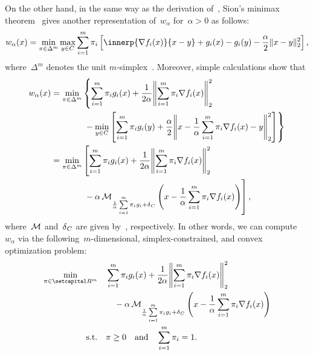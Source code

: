 \documentclass[../../main]{subfiles}
\begin{document}
            On the other hand, in the same way as the derivation of~, Sion's minimax theorem~\cite{Sion1958} gives another representation of~$w_\alpha$ for~$\alpha > 0$ as follows:
            \begin{equation} \label{eq:reg_lin_gap_MO_Sion}
                w_\alpha(x) = \min_{\pi \in \Delta^m} \max_{y \in C} \sum_{i = 1}^{m} \pi_i \left[ \innerp{\nabla f_i(x)}{x - y} + g_i(x) - g_i(y) - \frac{\alpha}{2} \norm{x - y}_2^2 \right] 
            ,\end{equation} 
            where~$\Delta^m$ denotes the unit $m$-simplex~.
            Moreover, simple calculations show that
            \begin{equation}
                \begin{alignedat}{2}
                    w_\alpha(x) &= \min_{\pi \in \Delta^m} &&\left\{ \sum_{i = 1}^{m} \pi_i g_i(x) + \frac{1}{2 \alpha} \norm*{\sum_{i = 1}^{m} \pi_i \nabla f_i(x)}_2^2 \right. \\
                                &&& \left. {}- \min_{y \in C} \left[ \sum_{i = 1}^{m} \pi_i g_i(y) + \frac{\alpha}{2} \norm*{x - \frac{1}{\alpha} \sum_{i = 1}^{m} \pi_i \nabla f_i(x) - y}_2^2 \right] \right\} \\
                                &= \min_{\pi \in \Delta^m} &&\left[ \sum_{i = 1}^{m} \pi_i g_i(x) + \frac{1}{2 \alpha} \norm*{\sum_{i = 1}^{m} \pi_i \nabla f_i(x)}_2^2 \right. \\
                                &&& \left. {}- \alpha \envelope_{\frac{1}{\alpha} \sum\limits_{i = 1}^{m} \pi_i g_i + \indicator_C} \left( x - \frac{1}{\alpha} \sum_{i = 1}^{m} \pi_i \nabla f_i(x) \right) \right]
                            ,\end{alignedat}
                        \end{equation} 
                        where~$\operatorname{\mathcal{M}}$ and~$\operatorname{\delta}_C$ are given by~, respectively.
                        In other words, we can compute~$w_\alpha$ via the following~$m$-dimensional, simplex-constrained, and convex optimization problem:
                        \begin{equation} \label{eq:dual_reg_lin_gap}
                            \begin{aligned}
                                \min_{\pi \in \setR^m} &&& \sum_{i = 1}^{m} \pi_i g_i(x) + \frac{1}{2 \alpha} \norm*{\sum_{i = 1}^{m} \pi_i \nabla f_i(x)}_2^2 \\
                                                       &&&\quad - \alpha \envelope_{\frac{1}{\alpha} \sum\limits_{i = 1}^{m} \pi_i g_i + \indicator_C}\left( x - \frac{1}{\alpha} \sum_{i = 1}^{m} \pi_i \nabla f_i(x) \right)  \\
                                \st &&& \pi \ge 0 \eqand \sum_{i = 1}^{m} \pi_i = 1 
                            .\end{aligned}
                        \end{equation} 
\end{document}
